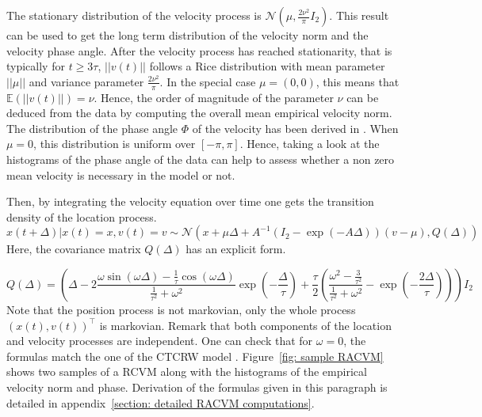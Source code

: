 \documentclass[11pt]{article}
\newcommand {\E}{\mathbb{E}}
\newcommand {\1}{\mathbb{1}}
\begin{document}
The stationary distribution of the velocity process is $\mathcal{N}\left(\mu,\frac{2\nu^2}{\pi} I_2\right)$. This result can be used to get the long term distribution of the velocity norm and the velocity phase angle. After the velocity process has reached stationarity, that is typically for $t \geq 3\tau$, $\vert \vert v(t) \vert \vert$ follows a Rice distribution with mean parameter $\vert \vert \mu \vert \vert$ and variance parameter $\frac{2\nu^2}{\pi}$. In the special case $\mu=(0,0)$, this means that $\E(\vert \vert v(t) \vert \vert)=\nu$. Hence, the order of magnitude of the parameter $\nu$ can be deduced from the data by computing the overall mean empirical velocity norm. The distribution of the phase angle $\Phi$ of the velocity has been derived in \cite{pawula_phase_1982}.
When $\mu=0$, this distribution is uniform over $[-\pi,\pi]$. Hence, taking a look at the histograms of the phase angle of the data can help to assess whether a non zero mean velocity is necessary in the model or not.

Then, by integrating the velocity equation over time one gets the transition density of the location process.
\begin{equation}
	x(t+\Delta) \vert x(t)=x, v(t)=v \sim \mathcal{N}\left(x+\mu \Delta+A^{-1} \left( I_2-\exp(-A\Delta)\right)(v-\mu),Q(\Delta)\right)  
\end{equation}
Here, the covariance matrix $Q(\Delta)$ has an explicit form.

\[
	Q(\Delta)=\left( \Delta-2 \frac{\omega \sin(\omega \Delta)-\frac{1}{\tau} \cos(\omega \Delta)}{\frac{1}{\tau^2}+\omega^2 } \exp\left( -\frac{\Delta}{\tau} \right) +\frac{\tau}{2} \left( \frac{\omega^2-\frac{3}{\tau^2}}{\frac{1}{\tau^2}+\omega^2}-\exp\left( -\frac{2\Delta}{\tau}\right)\right) \right) I_2
\]
Note that the position process is not markovian, only the whole process $(x(t), v(t))^\top$ is markovian.
Remark that both components of the location and velocity processes are independent.
One can check that for $\omega=0$, the formulas match the one of the CTCRW model \cite{johnson_continuous_2008}. Figure~\ref{fig: sample RACVM} shows two samples of a RCVM along with the histograms of the empirical velocity norm and phase. Derivation of the formulas given in this paragraph is detailed in appendix~\ref{section: detailed RACVM computations}.\\

\end{document}

